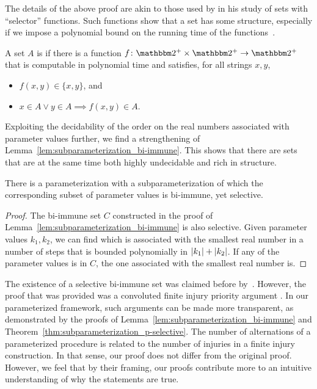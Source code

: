 The details of the above proof are akin to those used by \textcite{jockusch1968semirecursive} in his study of sets with \enquote{selector} functions.
Such functions show that a set has some structure, especially if we impose a polynomial bound on the running time of the functions~\parencite{selman1979p-selective}.
\begin{definition}
\label{def:p-selective}%
  A set $A$ is  if there is a function $f\colon \binary^+ \times \binary^+ \to \binary^+$ that is computable in polynomial time and satisfies, for all strings $x, y$,
  \begin{itemize}
  \item $f(x, y) \in \{x, y\}$, and
  \item $x \in A \lor y \in A \implies f(x, y) \in A$.
  \end{itemize}
\end{definition}

Exploiting the decidability of the order on the real numbers associated with parameter values further, we find a strengthening of Lemma~\ref{lem:subparameterization_bi-immune}.
This shows that there are sets that are at the same time both highly undecidable and rich in structure.
\begin{theorem}
\label{thm:subparameterization_p-selective}%
  There is a parameterization with a subparameterization of which the corresponding subset of parameter values is bi-immune, yet \pdash{}selective.
\end{theorem}
\begin{proof}
  The bi-immune set $C$ constructed in the proof of Lemma~\ref{lem:subparameterization_bi-immune} is also \pdash{}selective.
  Given parameter values $k_1, k_2$, we can find which is associated with the smallest real number in a number of steps that is bounded polynomially in ${\lvert k_1\rvert} + {\lvert k_2\rvert}$.
  If any of the parameter values is in $C$, the one associated with the smallest real number is.
\end{proof}

The existence of a \pdash{}selective bi-immune set was claimed before by~\textcite{goldsmith1993note}.
However, the proof that was provided was a convoluted finite injury priority argument \parencite[see also][Section~2.11]{downey2010algorithmic}.
In our parameterized framework, such arguments can be made more transparent, as demonstrated by the proofs of Lemma~\ref{lem:subparameterization_bi-immune} and Theorem~\ref{thm:subparameterization_p-selective}.
The number of alternations of a parameterized procedure is related to the number of injuries in a finite injury construction.
In that sense, our proof does not differ from the original proof.
However, we feel that by their framing, our proofs contribute more to an intuitive understanding of why the statements are true.
